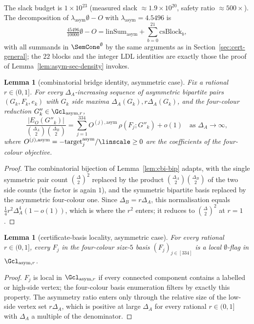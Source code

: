 \documentclass[11pt,a4paper]{article}
\newtheorem{lemma}[theorem]{Lemma}
\theoremstyle{definition}
\theoremstyle{remark}
\begin{document}
The slack budget is $1 \times 10^{23}$ (measured slack
$\approx 1.9 \times 10^{20}$, safety ratio $\approx 500\times$). The
decomposition of $\lambda_{\mathrm{asym}}\emptyset - O$ with
$\lambda_{\mathrm{asym}} = 4.5496$ is
\[
\tfrac{45496}{10000}\emptyset - O
= \mathrm{linSum}_{\mathrm{asym}}
+ \sum_{b = 0}^{21} \mathrm{csBlock}_b,
\]
with all summands in $\SemCone^\emptyset$ by the same arguments as in
Section~\ref{sec:cert-general}; the $22$ blocks and the integer LDL
identities are exactly those the proof of
Lemma~\ref{lem:asym-sec-density} invokes.

\begin{lemma}[combinatorial bridge identity, asymmetric case]
\label{lem:cbi-asym}
Fix a rational $r \in (0, 1]$. For every $\Delta_A$-increasing
sequence of asymmetric bipartite pairs $(G_k, F_k, e_k)$ with $G_k$
side maxima $\Delta_A(G_k), r\Delta_A(G_k)$, and the four-colour
reduction $G''_k \in \Gcl_{\mathrm{asym}, r}$,
\[
\frac{|E_O(G''_k)|}{\binom{\Delta_A}{2}\binom{\Delta_B}{2}}
= \sum_{j = 1}^{334}
O^{(j), \mathrm{asym}}\,\rho(F_j; G''_k) + o(1)
\quad\text{as } \Delta_A \to \infty,
\]
where $O^{(j),\mathrm{asym}} = -\mathrm{target}^{\mathrm{asym}}_j /
\linscale \geq 0$ are the coefficients of the four-colour objective.
\end{lemma}

\begin{proof}
The combinatorial bijection of Lemma~\ref{lem:cbi-bip} adapts, with
the single symmetric pair count $\binom{\Delta}{2}^2$ replaced by the
product $\binom{\Delta_A}{2}\binom{\Delta_B}{2}$ of the two side
counts (the factor is again $1$), and the symmetric bipartite basis
replaced by the asymmetric four-colour one. Since $\Delta_B = r\Delta_A$, this normalisation
equals $\tfrac14 r^2\Delta_A^4(1 - o(1))$, which is where the $r^2$
enters; it reduces to $\binom{\Delta}{2}^2$ at $r = 1$.
\end{proof}

\begin{lemma}[certificate-basis locality, asymmetric case]
\label{lem:basis-local-asym}
For every rational $r \in (0, 1]$, every $F_j$ in the four-colour
size-$5$ basis $(F_j)_{j \in [334]}$ is a local $\emptyset$-flag in
$\Gcl_{\mathrm{asym}, r}$.
\end{lemma}

\begin{proof}
$F_j$ is local in $\Gcl_{\mathrm{asym}, r}$ if every connected
component contains a labelled or high-side vertex; the four-colour
basis enumeration filters by exactly this property. The asymmetry
ratio enters only through the relative size of the low-side vertex set
$r\Delta_A$, which is positive at large $\Delta_A$ for every rational
$r \in (0, 1]$ with $\Delta_A$ a multiple of the denominator.
\end{proof}
\end{document}
